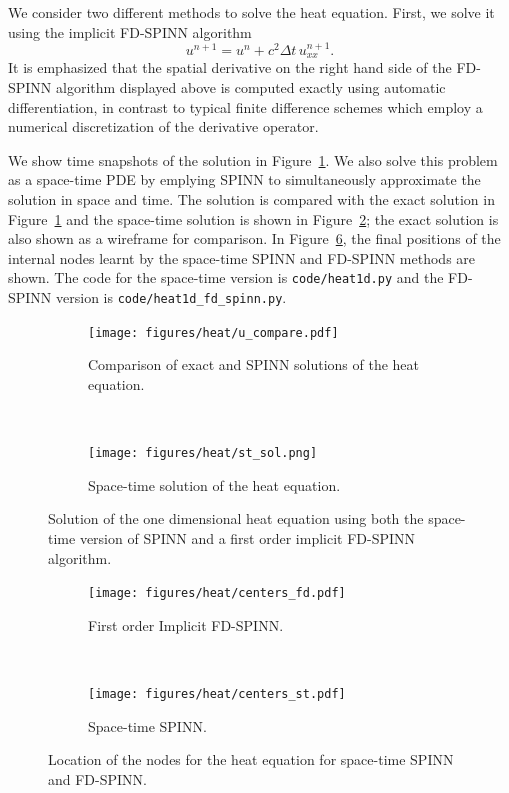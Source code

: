 \documentclass[12pt]{article}
\begin{document}
We consider two different methods to solve the heat equation. First, we solve it using the implicit FD-SPINN algorithm
\begin{displaymath}
u^{n+1} = u^n + c^2 \Delta t \, u^{n+1}_{xx}.
\end{displaymath}
It is emphasized that the spatial derivative on the right hand side of the FD-SPINN algorithm displayed above is computed exactly using automatic differentiation, in contrast to typical finite difference schemes which employ a numerical discretization of the derivative operator.

We show time snapshots of the solution in Figure~\ref{fig:heat_eqn_compare}. We also solve this problem as a space-time PDE by emplying SPINN to simultaneously approximate the solution in space and time. The solution is compared with the exact solution in Figure~\ref{fig:heat_eqn_compare} and the space-time solution is shown in Figure~\ref{fig:heat_eqn_st_sol}; the exact solution is also shown as a wireframe for comparison. In Figure~\ref{fig:heat_nodes}, the final positions of the internal nodes learnt by the space-time SPINN and FD-SPINN methods are shown. The code for the space-time version is \verb|code/heat1d.py| and the FD-SPINN version is \verb|code/heat1d_fd_spinn.py|.

\begin{figure}
\begin{subfigure}{0.5\textwidth}
\texttt{[image: figures/heat/u\_compare.pdf]}
\caption{Comparison of exact and SPINN solutions of the heat equation.}
\label{fig:heat_eqn_compare}
\end{subfigure}
~
\begin{subfigure}{0.5\textwidth}
\texttt{[image: figures/heat/st\_sol.png]}
\caption{Space-time solution of the heat equation.}
\label{fig:heat_eqn_st_sol}
\end{subfigure}
\caption{Solution of the one dimensional heat equation using both the space-time version of SPINN and a first order implicit FD-SPINN algorithm.}
\label{fig:heat_eqn}
\end{figure}

\begin{figure}
\begin{subfigure}{0.45\textwidth}
\centering
\texttt{[image: figures/heat/centers\_fd.pdf]}
\caption{First order Implicit FD-SPINN.}
\label{fig:heat_fdnodes}
\end{subfigure}
~
\begin{subfigure}{0.45\textwidth}
\centering
\texttt{[image: figures/heat/centers\_st.pdf]}
\caption{Space-time SPINN.}
\label{fig:heat_st_nodes}
\end{subfigure}
\caption{Location of the nodes for the heat equation for space-time SPINN and FD-SPINN.}
\label{fig:heat_nodes}
\end{figure}
\end{document}
